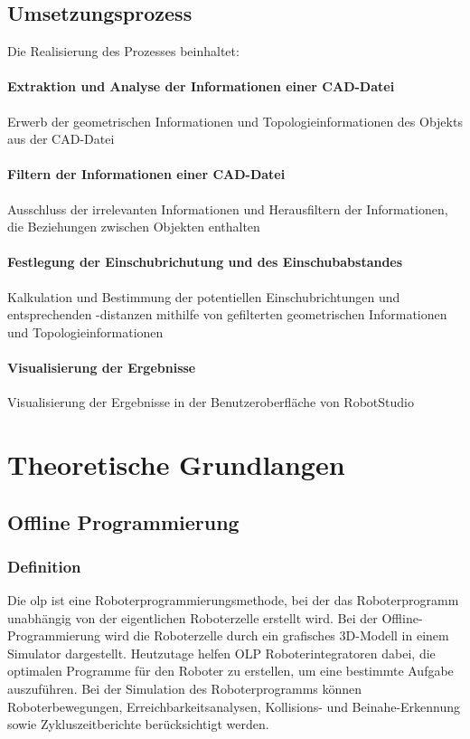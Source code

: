 \documentclass[14pt,a4paper,titlepage]{article}
\begin{document}
	\subsection{Umsetzungsprozess}
	Die Realisierung des Prozesses beinhaltet:
	\paragraph{Extraktion und Analyse der Informationen einer CAD-Datei}
	
	Erwerb der geometrischen Informationen und Topologieinformationen des Objekts aus der CAD-Datei
	\paragraph{Filtern der Informationen einer CAD-Datei}

	Ausschluss der irrelevanten Informationen und Herausfiltern der Informationen, die Beziehungen zwischen Objekten enthalten
	
	\paragraph{Festlegung der Einschubrichutung und des Einschubabstandes}
	Kalkulation und Bestimmung der potentiellen Einschubrichtungen und entsprechenden -distanzen mithilfe von gefilterten geometrischen Informationen und Topologieinformationen  
	
	\paragraph{Visualisierung der Ergebnisse}
	Visualisierung der Ergebnisse in der Benutzeroberfläche von RobotStudio
	\pagebreak
	\section{Theoretische Grundlangen}
	\subsection{Offline Programmierung}
	\subsubsection{Definition}
	Die \acf{olp} ist eine Roboterprogrammierungsmethode, bei der das Roboterprogramm unabhängig von der eigentlichen Roboterzelle erstellt wird. Bei der Offline-Programmierung wird die Roboterzelle durch ein grafisches 3D-Modell in einem Simulator dargestellt. Heutzutage helfen OLP Roboterintegratoren dabei, die optimalen Programme für den Roboter zu erstellen, um eine bestimmte Aufgabe auszuführen. Bei der Simulation des Roboterprogramms können Roboterbewegungen, Erreichbarkeitsanalysen, Kollisions- und Beinahe-Erkennung sowie Zykluszeitberichte berücksichtigt werden\cite{offline-programming}.
	\bigbreak
\end{document}
